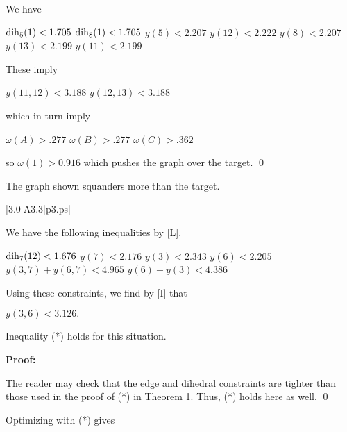 We have 

$\operatorname{dih}_5(1) < 1.705$ \newline
$\operatorname{dih}_8(1) < 1.705$ \newline
$y(5)<2.207$ \newline
$y(12)<2.222$ \newline
$y(8)<2.207$ \newline
$y(13)<2.199$ \newline
$y(11)<2.199$ \newline

These imply 

$y(11,12)<3.188$ \newline
$y(12,13)<3.188$ \newline

which in turn imply

$\omega(A)>.277$ \newline
$\omega(B)>.277$ \newline
$\omega(C)>.362$ \newline

so $\omega(1)>0.916$ which pushes the graph over the target. \qed



\bigskip



 The graph shown 
squanders more than the target.  \endproclaim

\gram|3.0|A3.3|p3.ps|  %


We have the following inequalities by [L].

$\operatorname{dih}_7(12) < 1.676$ \newline
$y(7) < 2.176$ \newline
$y(3) < 2.343$ \newline
$y(6) < 2.205$ \newline
$y(3,7)+y(6,7) < 4.965$ \newline
$y(6) + y(3) < 4.386$ \newline

Using these constraints, we find by [I] that

$y(3,6)<3.126.$

 Inequality (*) holds for this situation. \endproclaim

{\bf Proof:}

The reader may check that the edge and dihedral constraints are tighter than those used in the proof of (*) in Theorem 1.  Thus, (*) holds here as well. \qed

Optimizing with (*) gives

